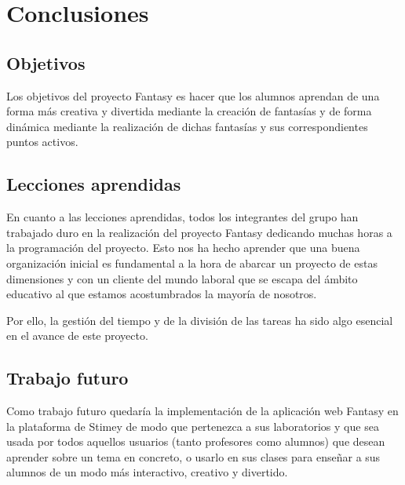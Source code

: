 \chapter{Conclusiones}
\section{Objetivos}
Los objetivos del proyecto Fantasy es hacer que los alumnos aprendan de una forma más creativa y divertida mediante la creación de fantasías y de forma dinámica mediante la realización de dichas fantasías y sus correspondientes puntos activos.

\section{Lecciones aprendidas}
En cuanto a las lecciones aprendidas, todos los integrantes del grupo han trabajado duro en la realización del proyecto Fantasy dedicando muchas horas a la programación del proyecto. Esto nos ha hecho aprender que una buena organización inicial es fundamental a la hora de abarcar un proyecto de estas dimensiones y con un cliente del mundo laboral que se escapa del ámbito educativo al que estamos acostumbrados la mayoría de nosotros.

Por ello, la gestión del tiempo y de la división de las tareas ha sido algo esencial en el avance de este proyecto.

\section{Trabajo futuro}
Como trabajo futuro quedaría la implementación de la aplicación web Fantasy en la plataforma de Stimey de modo que pertenezca a sus laboratorios y que sea usada por todos aquellos usuarios (tanto profesores como alumnos) que desean aprender sobre un tema en concreto, o usarlo en sus clases para enseñar a sus alumnos de un modo más interactivo, creativo y divertido.
